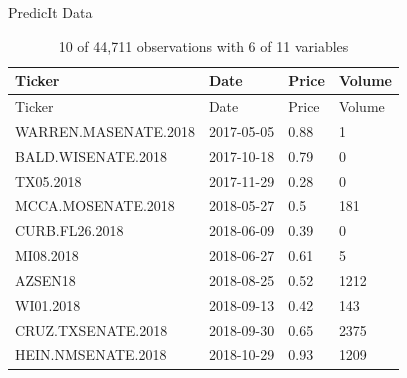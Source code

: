 \documentclass[ignorenonframetext,]{beamer}
\begin{document}
\begin{frame}{PredicIt Data}
\protect\hypertarget{predicit-data}{}

\begin{longtable}[]{@{}llll@{}}
\caption{10 of 44,711 observations with 6 of 11
variables}\tabularnewline
\toprule
Ticker & Date & Price & Volume\tabularnewline
\midrule
\endfirsthead
\toprule
Ticker & Date & Price & Volume\tabularnewline
\midrule
\endhead
WARREN.MASENATE.2018 & 2017-05-05 & 0.88 & 1\tabularnewline
BALD.WISENATE.2018 & 2017-10-18 & 0.79 & 0\tabularnewline
TX05.2018 & 2017-11-29 & 0.28 & 0\tabularnewline
MCCA.MOSENATE.2018 & 2018-05-27 & 0.5 & 181\tabularnewline
CURB.FL26.2018 & 2018-06-09 & 0.39 & 0\tabularnewline
MI08.2018 & 2018-06-27 & 0.61 & 5\tabularnewline
AZSEN18 & 2018-08-25 & 0.52 & 1212\tabularnewline
WI01.2018 & 2018-09-13 & 0.42 & 143\tabularnewline
CRUZ.TXSENATE.2018 & 2018-09-30 & 0.65 & 2375\tabularnewline
HEIN.NMSENATE.2018 & 2018-10-29 & 0.93 & 1209\tabularnewline
\bottomrule
\end{longtable}

\end{frame}
\end{document}

